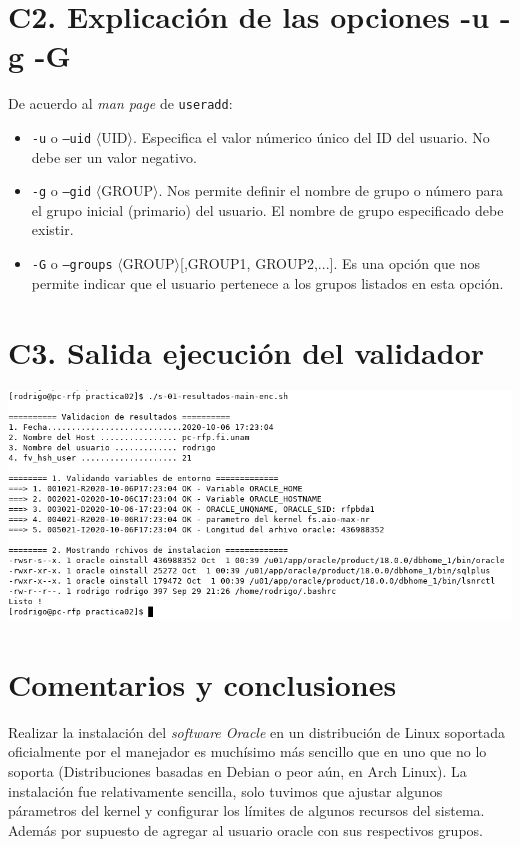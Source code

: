 \documentclass{article}
\begin{document}
\section*{C2. Explicación de las opciones -u -g -G}

De acuerdo al \textit{man page} de \texttt{useradd}:

\begin{itemize}
    \item \texttt{-u} o \texttt{--uid} $\langle$UID$\rangle$. Especifica el 
    valor númerico único del ID del usuario. No debe ser un valor negativo.
    \item \texttt{-g} o \texttt{--gid} $\langle$GROUP$\rangle$. Nos permite 
    definir el nombre de grupo o número para el grupo inicial (primario) del 
    usuario. El nombre de grupo especificado debe existir.
    \item \texttt{-G} o \texttt{--groups} $\langle$GROUP$\rangle$[,GROUP1,
    GROUP2,...]. Es una opción que nos permite indicar que el usuario pertenece 
    a los grupos listados en esta opción.
\end{itemize}

\section*{C3. Salida ejecución del validador}
\includegraphics[width=16cm]{c03}    

\section*{Comentarios y conclusiones}

Realizar la instalación del \textit{software Oracle} en un distribución de Linux
soportada oficialmente por el manejador es muchísimo más sencillo que en uno que
no lo soporta (Distribuciones basadas en Debian o peor aún, en Arch Linux).
La instalación fue relativamente sencilla, solo tuvimos que ajustar algunos 
párametros del kernel y configurar los límites de algunos recursos del sistema.
Además por supuesto de agregar al usuario oracle con sus respectivos grupos.\\
\end{document}
